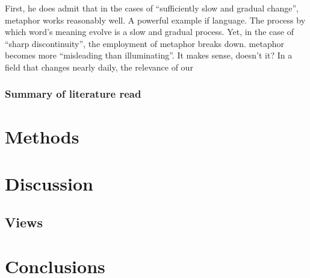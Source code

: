 \documentclass[11pt, oneside]{article}   	%
\begin{document}
First, he does admit that in the cases of ``sufficiently slow and gradual change'', metaphor works reasonably well. A powerful example if language. The process by which word's meaning evolve is a slow and gradual process. Yet, in the case of ``sharp discontinuity'', the employment of metaphor breaks down. metaphor becomes more ``misleading than illuminating''. It makes sense, doesn't it? In a field that changes nearly daily, the relevance of our 

\cite{ewd1036}

\subsubsection{Summary of literature read}

\section{Methods}
\section{Discussion}
\subsection{Views}

\section{Conclusions}




\end{document}
